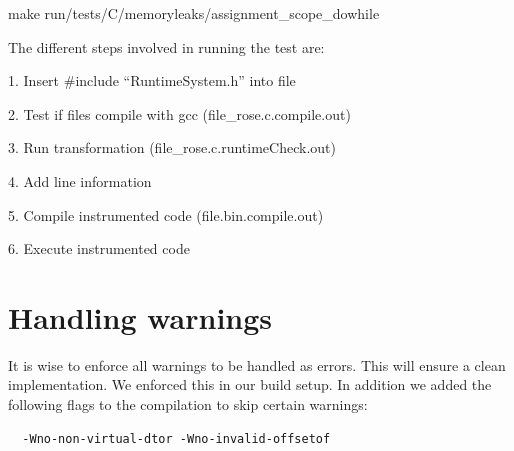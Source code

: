   make run/tests/C/memoryleaks/assignment\_scope\_dowhile

The different steps involved in running the test are:

1. Insert \#include ``RuntimeSystem.h'' into file

2. Test if files compile with gcc (file\_rose.c.compile.out)

3. Run transformation (file\_rose.c.runtimeCheck.out)

4. Add line information

5. Compile instrumented code (file.bin.compile.out)

6. Execute instrumented code



\section{Handling warnings}

It is wise to enforce all warnings to be handled as errors. This will ensure a clean implementation. We enforced this in our build setup.
In addition we added the following flags to the compilation to skip certain warnings:

\begin{verbatim}
  -Wno-non-virtual-dtor -Wno-invalid-offsetof 
\end{verbatim}

